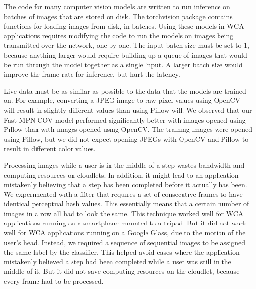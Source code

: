 The code for many computer vision models are written to run inference on batches
of images that are stored on disk. The torchvision package contains functions
for loading images from disk, in batches. Using these models in WCA applications
requires modifying the code to run the models on images being transmitted over
the network, one by one. The input batch size must be set to 1, because anything
larger would require building up a queue of images that would be run through the
model together as a single input. A larger batch size would improve the
frame rate for inference, but hurt the latency.

Live data must be as similar as possible to the data that the models are trained
on. For example, converting a
JPEG image to raw pixel values using OpenCV will result in slightly different
values than using Pillow will. We observed that our Fast MPN-COV model performed
significantly better with images opened using Pillow than with images opened
using OpenCV. The training images were opened using Pillow, but we did not
expect opening JPEGs with OpenCV and Pillow to result in different color values.

Processing images while a user is in the middle of a step wastes bandwidth and
computing resources on cloudlets.
In addition, it might lead to an application mistakenly
believing that a step has been completed before it actually has been.
We experimented with a filter that requires a set of consecutive frames to have
identical perceptual hash values.
This essentially means that a certain number of images in a row all had to look
the same.
This technique worked well for WCA applications running on a smartphone mounted
to a tripod.
But it did not work well for WCA applications running on a Google Glass, due to
the motion of the user's head.
Instead, we required a sequence of sequential images to be assigned the same
label by the classifier.
This helped avoid cases where the application mistakenly believed a step had
been completed while a user was still in the middle of it.
But it did not save computing resources on the cloudlet, because every frame had
to be processed.
